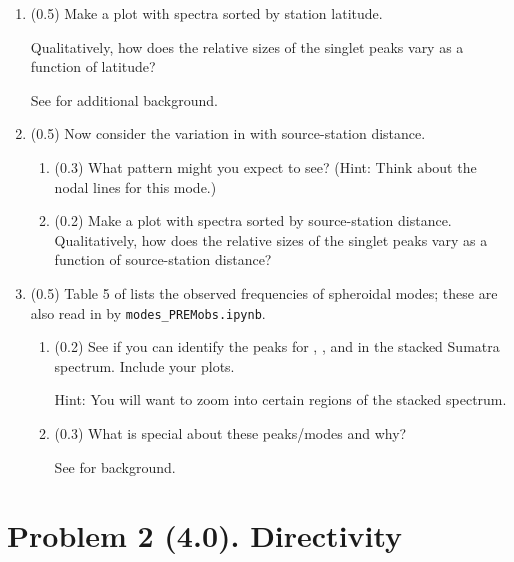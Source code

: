 \documentclass[11pt,titlepage,fleqn]{article}
\begin{document}
\begin{enumerate}
\item (0.5) Make a plot with   spectra sorted by station latitude.

Qualitatively, how does the relative sizes of the singlet peaks vary as a function of latitude?

See \citet[][Figure 3]{SSteinOkal2007} for additional background.


\item (0.5) Now consider the variation in  with source-station distance.
%
\begin{enumerate}
\item (0.3) What pattern might you expect to see? (Hint: Think about the nodal lines for this mode.)

\item (0.2) Make a plot with   spectra sorted by source-station distance. Qualitatively, how does the relative sizes of the singlet peaks vary as a function of source-station distance?
\end{enumerate}


\item (0.5) Table 5 of \citet{PREM} lists the observed frequencies of spheroidal modes; these are also read in by \verb+modes_PREMobs.ipynb+.
%
\begin{enumerate}
\item (0.2) See if you can identify the peaks for , , and  in the stacked Sumatra spectrum. Include your plots.

Hint: You will want to zoom into certain regions of the stacked spectrum.

\item (0.3) What is special about these peaks/modes and why?

See \citet[][p. 106]{SteinWysession} for background.
\end{enumerate}

\end{enumerate}


\pagebreak
\section*{Problem 2 (4.0). Directivity}
\end{document}
